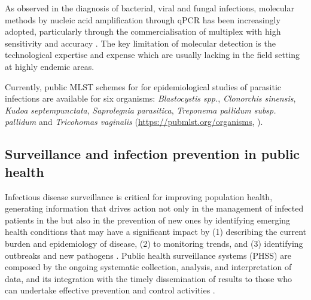As observed in the diagnosis of bacterial, viral and fungal infections, molecular methods by nucleic acid amplification through qPCR has been increasingly adopted, particularly through the commercialisation of multiplex with high sensitivity and accuracy \citep{momcilovic_rapid_2019, wong_molecular_2014}. The key limitation of molecular detection is the technological expertise and expense which are usually lacking in the field setting at highly endemic areas.

Currently, public MLST schemes for for epidemiological studies of parasitic infections are available for six organisms: \textit{Blastocystis spp.},\textit{ Clonorchis sinensis}, \textit{Kudoa septempunctata}, \textit{Saprolegnia parasitica}, \textit{Treponema pallidum subsp. pallidum} and \textit{Tricohomas vaginalis} (\url{https://pubmlst.org/organisms}, \cite{jolley_open-access_2018}).

\subsection{Surveillance and infection prevention in public health} \label{ssec:survaillance}

Infectious disease surveillance is critical for improving population health, generating information that drives action not only in the management of infected patients in the but also in the prevention of new ones by identifying emerging health conditions that may have a significant impact by (1) describing the current burden and epidemiology of disease, (2) to monitoring trends, and (3) identifying outbreaks and new pathogens \citep{groseclose_public_2017, murray_infectious_2017}. Public health surveillance systems (PHSS) are composed by the ongoing systematic collection, analysis, and interpretation of data, and its integration with the timely dissemination of results to those who can undertake effective prevention and control activities \citep{teutsch_considerations_2010}. 

